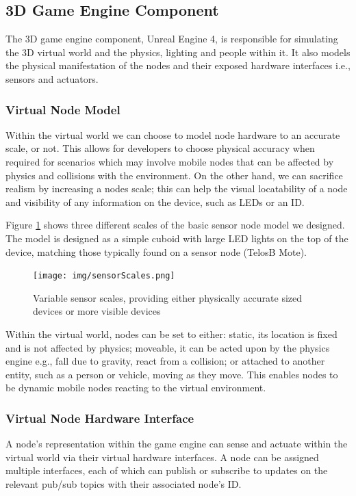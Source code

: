 \subsection{3D Game Engine Component} %
\label{sub:3d_game_engine_component}
The 3D game engine component, Unreal Engine 4, is responsible for simulating the 3D virtual world and the physics, lighting and people within it. It also models the physical manifestation of the nodes and their exposed hardware interfaces i.e., sensors and actuators.

\subsubsection{Virtual Node Model} %
\label{ssub:virtual_node_hardware}
Within the virtual world we can choose to model node hardware to an accurate scale, or not. This allows for developers to choose physical accuracy when required for scenarios which may involve mobile nodes that can be affected by physics and collisions with the environment. On the other hand, we can sacrifice realism by increasing a nodes scale; this can help the visual locatability of a node and visibility of any information on the device, such as LEDs or an ID.

Figure \ref{fig:sensor_scales} shows three different scales of the basic sensor node model we designed. The model is designed as a simple cuboid with large LED lights on the top of the device, matching those typically found on a sensor node (TelosB Mote).
\begin{figure}[tbh]
   \centering
   \texttt{[image: img/sensorScales.png]}
   \caption{Variable sensor scales, providing either physically accurate sized devices or more visible devices}
   \label{fig:sensor_scales}
 \end{figure} 

Within the virtual world, nodes can be set to either: static, its location is fixed and is not affected by physics; moveable, it can be acted upon by the physics engine e.g., fall due to gravity, react from a collision; or attached to another entity, such as a person or vehicle, moving as they move. This enables nodes to be dynamic mobile nodes reacting to the virtual environment.


\subsubsection{Virtual Node Hardware Interface} %
\label{ssub:virtual_hardware_interface}
A node's representation within the game engine can sense and actuate within the virtual world via their virtual hardware interfaces. A node can be assigned multiple interfaces, each of which can publish or subscribe to updates on the relevant pub/sub topics with their associated node's ID. 

